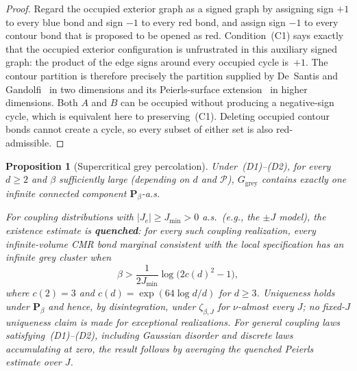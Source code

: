 \documentclass[11pt]{article}
\newtheorem{proposition}[theorem]{Proposition}
\numberwithin{theorem}{section}
\theoremstyle{remark}
\begin{document}
\begin{proof}
Regard the occupied exterior graph as a signed graph by assigning sign $+1$ to every blue bond and sign $-1$ to every red bond, and assign sign $-1$ to every contour bond that is proposed to be opened as red.
Condition~\textup{(C1)} says exactly that the occupied exterior configuration is unfrustrated in this auxiliary signed graph: the product of the edge signs around every occupied cycle is~$+1$.
The contour partition is therefore precisely the partition supplied by De~Santis and Gandolfi~\cite[Lemma~2.1]{DSG1999} in two dimensions and its Peierls-surface extension~\cite[Lemma~2.4]{DSG1999} in higher dimensions.
Both $A$ and $B$ can be occupied without producing a negative-sign cycle, which is equivalent here to preserving~\textup{(C1)}.
Deleting occupied contour bonds cannot create a cycle, so every subset of either set is also red-admissible.
\end{proof}

\begin{proposition}[Supercritical grey percolation]\label{prop:grey-perc}
Under~\textup{(D1)--(D2)}, for every $d \geq 2$ and $\beta$ sufficiently large (depending on $d$ and $\mathscr{P}$), $G_{\mathrm{grey}}$ contains exactly one infinite connected component $\mathbf{P}_\beta$-a.s.

For coupling distributions with $|J_e| \geq J_{\min} > 0$ a.s.\ (e.g., the $\pm J$ model), the \emph{existence estimate} is \textbf{quenched}: for every such coupling realization, every infinite-volume CMR bond marginal consistent with the local specification has an infinite grey cluster when
\[
  \beta > \frac{1}{2J_{\min}} \log\!\bigl(2c(d)^2 - 1\bigr),
\]
where $c(2) = 3$ and $c(d) = \exp(64\log d / d)$ for $d \geq 3$.
Uniqueness holds under $\mathbf{P}_\beta$ and hence, by disintegration, under $\zeta_{\beta,J}$ for $\nu$-almost every $J$; no fixed-$J$ uniqueness claim is made for exceptional realizations.
For general coupling laws satisfying~\textup{(D1)--(D2)}, including Gaussian disorder and discrete laws accumulating at zero, the result follows by averaging the quenched Peierls estimate over $J$.
\end{proposition}
\end{document}
